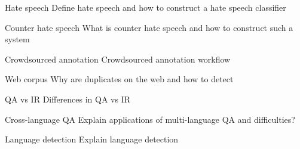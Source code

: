 \documentclass{article}
\begin{document}
\begin{exercise}{Hate speech}
  Define hate speech and how to construct a hate speech classifier

  \begin{solution}
  \end{solution}
\end{exercise}

\begin{exercise}{Counter hate speech}
  What is counter hate speech and how to construct such a system

  \begin{solution}
  \end{solution}
\end{exercise}

\begin{exercise}{Crowdsourced annotation}
  Crowdsourced annotation workflow

  \begin{solution}
  \end{solution}
\end{exercise}

\begin{exercise}{Web corpus}
  Why are duplicates on the web and how to detect

  \begin{solution}
  \end{solution}
\end{exercise}

\begin{exercise}{QA vs IR}
  Differences in QA vs IR

  \begin{solution}
  \end{solution}
\end{exercise}

\begin{exercise}{Cross-language QA}
  Explain applications of multi-language QA and difficulties?

  \begin{solution}
  \end{solution}
\end{exercise}

\begin{exercise}{Language detection}
  Explain language detection

  \begin{solution}
  \end{solution}
\end{exercise}
\end{document}
